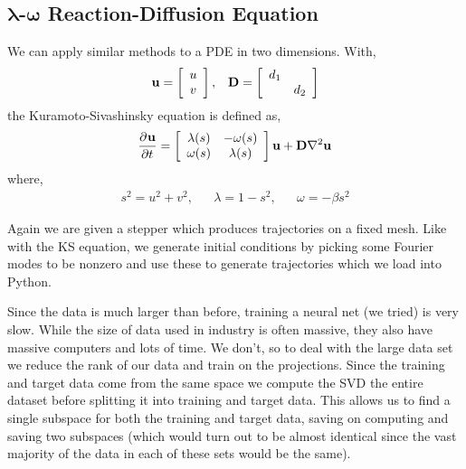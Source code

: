 \documentclass[10pt]{article}
\begin{document}
\subsection{ \( \boldsymbol\lambda \)-\( \boldsymbol\omega \) Reaction-Diffusion Equation}
We can apply similar methods to a PDE in two dimensions.
With,
\begin{align*}
    {\bf u} = \left[\begin{array}{c}u \\ v\end{array}\right], &&
    {\bf D} = \left[\begin{array}{cc}d_1 \\ & d_2 \end{array}\right]
\end{align*}
the Kuramoto-Sivashinsky equation is defined as,
\begin{align}
    \frac{\partial^{}{\bf u}}{\partial t^{}} =
    \left[\begin{array}{cc}
        \lambda(s) & -\omega(s) \\
        \omega(s) & \lambda(s)
    \end{array}\right]
    {\bf u}
    + {\bf D} \nabla^2 {\bf u} \label{RD_eqn}
\end{align}
where,
\begin{align*}
    s^2 = u^2 + v^2, &&
    \lambda = 1-s^2, &&
    \omega = -\beta s^2
\end{align*}

Again we are given a stepper which produces trajectories on a fixed mesh. Like with the KS equation, we generate initial conditions by picking some Fourier modes to be nonzero and use these to generate trajectories which we load into Python.

Since the data is much larger than before, training a neural net (we tried) is very slow. While the size of data used in industry is often massive, they also have massive computers and lots of time. We don't, so to deal with the large data set we reduce the rank of our data and train on the projections. Since the training and target data come from the same space we compute the SVD the entire dataset before splitting it into training and target data. This allows us to find a single subspace for both the training and target data, saving on computing and saving two subspaces (which would turn out to be almost identical since the vast majority of the data in each of these sets would be the same).
\end{document}
